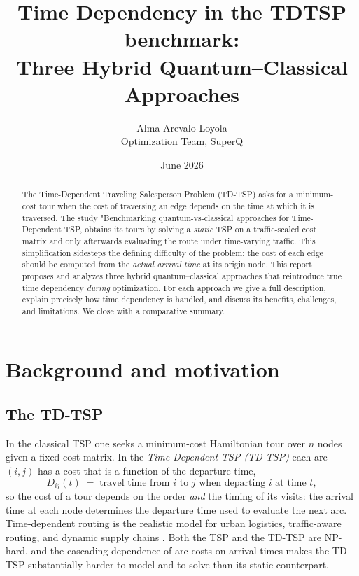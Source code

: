 \documentclass[11pt]{article}
\title{\textbf{Time Dependency in the TDTSP benchmark:\\
Three Hybrid Quantum--Classical Approaches}}
\author{Alma Arevalo Loyola\\ \small Optimization Team, SuperQ}
\date{June 2026}
\newcommand{\emphasize}[1]{\textcolor{emphasisblue}{\textit{#1}}}
\begin{document}
\maketitle

\begin{abstract}
\noindent
The Time-Dependent Traveling Salesperson Problem (TD-TSP) asks for a minimum-cost
tour when the cost of traversing an edge depends on the time at which it is traversed.
The study "Benchmarking quantum-vs-classical approaches for Time-Dependent TSP,
obtains its tours by solving a \emph{static} TSP on a traffic-scaled cost matrix and
only afterwards evaluating the route under time-varying traffic. This simplification
sidesteps the defining difficulty of the problem: the cost of each edge should be
computed from the \emph{actual arrival time} at its origin node. This report proposes and
analyzes three hybrid quantum--classical approaches that reintroduce true time dependency
\emph{during} optimization. For each approach we give a full description, explain
precisely how time dependency is handled, and discuss its benefits, challenges, and
limitations. We close with a comparative summary.
\end{abstract}

\tableofcontents

\section{Background and motivation}
\label{sec:background}

\subsection{The TD-TSP}
In the classical TSP one seeks a minimum-cost Hamiltonian tour over $n$ nodes given a
fixed cost matrix. In the \emphasize{Time-Dependent TSP (TD-TSP)} each arc $(i,j)$ has a
cost that is a function of the departure time,
\[
  D_{ij}(t) \;=\; \text{travel time from $i$ to $j$ when departing $i$ at time $t$},
\]
so the cost of a tour depends on the order \emph{and} the timing of its visits: the
arrival time at each node determines the departure time used to evaluate the next arc.
Time-dependent routing is the realistic model for urban logistics, traffic-aware routing,
and dynamic supply chains \cite{gendreau2015time}. Both the TSP and the TD-TSP are
NP-hard, and the cascading dependence of arc costs on arrival times makes the TD-TSP
substantially harder to model and to solve than its static counterpart.
\end{document}
